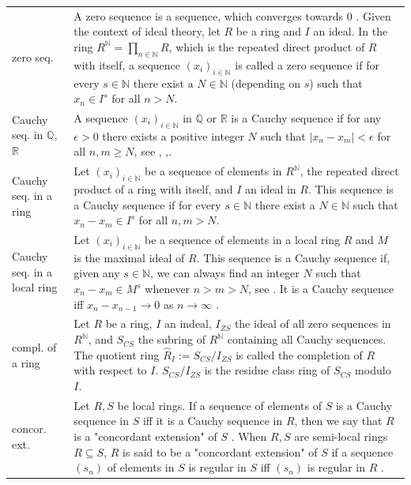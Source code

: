 \documentclass[12pt]{amsart}
\theoremstyle{definition}
\begin{document}
{\renewcommand{\arraystretch}{1.8}
\begin{table}[H]
	\centering
	\begin{tabular}{|P{1.4cm} p{13.4cm}|}
		\hline
		zero seq. & A zero sequence is a sequence, which converges towards $0$ \cite[p.~154]{Ref_Schmidt_2007}. Given the context of ideal theory, let $R$ be a ring and $I$ an ideal. In the ring $R^\mathbb{N}=\prod_{n\in\mathbb{N}}R$, which is the repeated direct product of $R$ with itself, a sequence $(x_i)_{i\in\mathbb{N}}$ is called a zero sequence if for every $s\in\mathbb{N}$ there exist a $N\in\mathbb{N}$ (depending on $s$) such that $x_n\in I^s$ for all $n>N$.
		\\
		Cauchy seq. in $\mathbb{Q}$, $\mathbb{R}$ & A sequence $(x_i)_{i\in\mathbb{N}}$ in $\mathbb{Q}$ or $\mathbb{R}$ is a Cauchy sequence if for any $\epsilon>0$ there exists a positive integer $N$ such that $|x_n-x_m|<\epsilon$ for all $n,m\ge N$, see \cite[p.~153]{Ref_Schmidt_2007}, \cite[p.~24]{Ref_Higham_2015},\cite[p.~10]{Ref_Koblitz_1984}.
		\\
		Cauchy seq. in a ring & Let $(x_i)_{i\in\mathbb{N}}$ be a sequence of elements in $R^\mathbb{N}$, the repeated direct product of a ring with itself, and $I$ an ideal in $R$. This sequence is a Cauchy sequence if for every $s\in\mathbb{N}$ there exist a $N\in\mathbb{N}$ such that $x_n-x_m\in I^s$ for all $n,m>N$.
		\\
		Cauchy seq. in a local ring & Let $(x_i)_{i\in\mathbb{N}}$ be a sequence of elements in a local ring $R$ and $M$ is the maximal ideal of $R$. This sequence is a Cauchy sequence if, given any $s\in\mathbb{N}$, we can always find an integer $N$ such that $x_n-x_m\in M^s$ whenever $n>m>N$, see \cite[p.~63, 85]{Ref_Northcott_1953}. It is a Cauchy sequence iff $x_n-x_{n-1}\rightarrow0$ as $n\rightarrow\infty$ \cite[p.~85]{Ref_Northcott_1953}.
		\\
		compl. of a ring & Let $R$ be a ring, $I$ an indeal, $I_{ZS}$ the ideal of all zero sequences in $R^\mathbb{N}$, and $S_{CS}$ the subring of $R^\mathbb{N}$ containing all Cauchy sequences. The quotient ring $\hat R_I:=S_{CS}/I_{ZS}$ is called the completion of $R$ with respect to $I$. $S_{CS}/I_{ZS}$ is the residue class ring of $S_{CS}$ modulo $I$.
		\\
		concor. ext. & Let $R,S$ be local rings. If a sequence of elements of $S$ is a Cauchy sequence in $S$ iff it is a Cauchy sequence in $R$, then we say that $R$ is a "concordant extension" of $S$ \cite[p.~87]{Ref_Northcott_1953}. When $R,S$ are semi-local rings $R\subseteq S$, $R$ is said to be a "concordant extension" of $S$ if a sequence $(s_n)$ of elements in $S$ is regular in $S$ iff $(s_n)$ is regular in $R$ \cite{Ref_Batho_1959}.

\end{tabular}
\end{table}}
\end{document}
